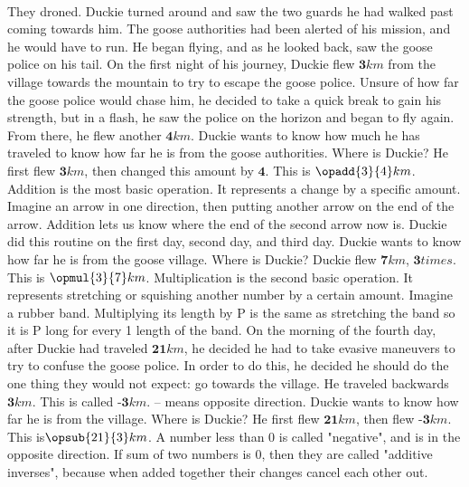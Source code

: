 \paragraph{} They droned. Duckie turned around and saw the two guards he had walked past coming towards him. The goose authorities had been alerted of his mission, and he would have to run. He began flying, and as he looked back, saw the goose police on his tail. 
\vfill
\pagebreak
{On the first night of his journey, Duckie flew $\textbf{3} km$ from the village towards the mountain to try to escape the goose police. Unsure of how far the goose police would chase him, he decided to take a quick break to gain his strength, but in a flash, he saw the police on the horizon and began to fly again. From there, he flew another $\textbf{4} km$. Duckie wants to know how much he has traveled to know how far he is from the goose authorities. Where is Duckie?}
{He first flew $\textbf{3} km$, then changed this amount by $\textbf{4}$. This is $\opadd{3}{4} km$.}
{Addition is the most basic operation. It represents a change by a specific amount. Imagine an arrow in one direction, then putting another arrow on the end of the arrow. Addition lets us know where the end of the second arrow now is.} 
{}
{Duckie did this routine on the first day, second day, and third day.  Duckie wants to know how far he is from the goose village. Where is Duckie?}
{Duckie flew $\textbf{7} km$, $\textbf{3} times$. This is $\opmul{3}{7} km$.}
{Multiplication is the second basic operation. It represents stretching or squishing another number by a certain amount. Imagine a rubber band. Multiplying its length by P is the same as stretching the band so it is P long for every 1 length of the band.}
{}
{On the morning of the fourth day, after Duckie had traveled $\textbf{21} km$, he decided he had to take evasive maneuvers to try to confuse the goose police. In order to do this, he decided he should do the one thing they would not expect: go towards the village. He traveled backwards $\textbf{3} km$. This is called $\textbf{-3} km$. \linebreak – means opposite direction. Duckie wants to know how far he is from the village. Where is Duckie?}
{He first flew $\textbf{21} km$, then flew $\textbf{-3} km$. This is$ \opsub{21}{3} km$.}
{A number less than 0 is called "negative", and is in the opposite direction. If sum of two numbers is 0, then they are called "additive inverses", because when added together their changes cancel each other out.}
